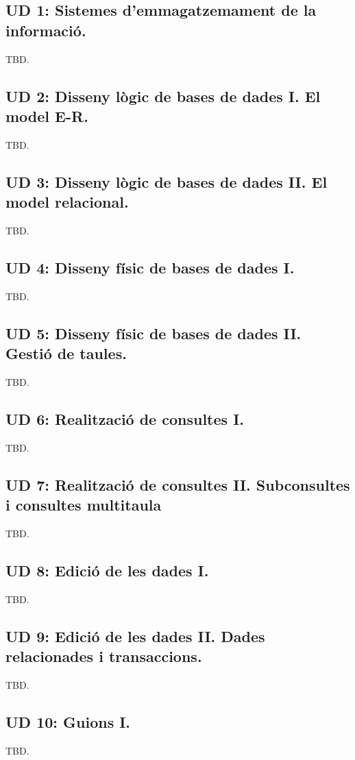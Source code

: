 \documentclass[catalan, a4paper, 12pt, titlepage]{article}
\begin{document}
  \subsection{UD 1: Sistemes d'emmagatzemament de la informació.}
  TBD.

  \subsection{UD 2: Disseny lògic de bases de dades I. El model E-R.}
  TBD.

  \subsection{UD 3: Disseny lògic de bases de dades II. El model relacional.}
  TBD.

  \subsection{UD 4: Disseny físic de bases de dades I.}
  TBD.

  \subsection{UD 5: Disseny físic de bases de dades II. Gestió de taules.}
  TBD.

  \subsection{UD 6: Realització de consultes I.}
  TBD.

  \subsection{UD 7: Realització de consultes II. Subconsultes i consultes multitaula}
  TBD.

  \subsection{UD 8: Edició de les dades I.}
  TBD.

  \subsection{UD 9: Edició de les dades II. Dades relacionades i transaccions.}
  TBD.

  \subsection{UD 10: Guions I.}
  TBD.
\end{document}
